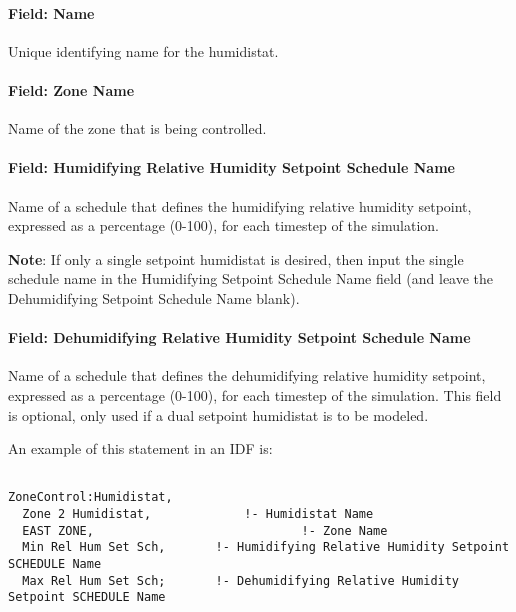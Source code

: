 \paragraph{Field: Name}\label{field-name-6-026}

Unique identifying name for the humidistat.

\paragraph{Field: Zone Name}\label{field-zone-name-014}

Name of the zone that is being controlled.

\paragraph{Field: Humidifying Relative Humidity Setpoint Schedule Name}\label{field-humidifying-relative-humidity-setpoint-schedule-name}

Name of a schedule that defines the humidifying relative humidity setpoint, expressed as a percentage (0-100), for each timestep of the simulation.

\textbf{Note}: If only a single setpoint humidistat is desired, then input the single schedule name in the Humidifying Setpoint Schedule Name field (and leave the Dehumidifying Setpoint Schedule Name blank).

\paragraph{Field: Dehumidifying Relative Humidity Setpoint Schedule Name}\label{field-dehumidifying-relative-humidity-setpoint-schedule-name-1}

Name of a schedule that defines the dehumidifying relative humidity setpoint, expressed as a percentage (0-100), for each timestep of the simulation. This field is optional, only used if a dual setpoint humidistat is to be modeled.

An example of this statement in an IDF is:

\begin{lstlisting}

ZoneControl:Humidistat,
  Zone 2 Humidistat,             !- Humidistat Name
  EAST ZONE,                             !- Zone Name
  Min Rel Hum Set Sch,       !- Humidifying Relative Humidity Setpoint SCHEDULE Name
  Max Rel Hum Set Sch;       !- Dehumidifying Relative Humidity Setpoint SCHEDULE Name
\end{lstlisting}

